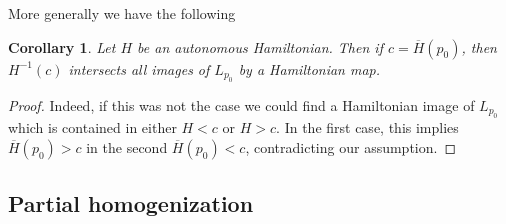 \documentclass[JEP,XML,SOM,NoFloatCountersInSection,Unicode,published]{cedram}
\numberwithin{equation}{section}
\theoremstyle{plain}
\newtheorem{corollary}[theorem]{Corollary}
\theoremstyle{definition}
\theoremstyle{remark}
\begin{document}
More generally we have the following
\begin{corollary}
Let $H$ be an autonomous Hamiltonian. Then if $c=\overline H(p_0)$, then $H^{-1}(c)$
intersects all images of $L_{p_0}$ by a Hamiltonian map.
\end{corollary}
\begin{proof}
Indeed, if this was not the case we could find a Hamiltonian image of $L_{p_0}$ which is contained in either $H<c$ or $H>c$. In the first case, this implies $\overline H(p_0) >c$ in the second $\overline H(p_0) <c$, contradicting our assumption.
\end{proof}

\subsection{Partial homogenization}
\end{document}
